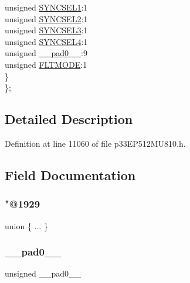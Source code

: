 \begin{DoxyCompactItemize}
\begin{tabbing}
\>\>unsigned \hyperlink{structtag_o_c1_c_o_n2_b_i_t_s_a50e73f95ab1c258ddc64f69c0991deaf}{SYNCSEL1}:1\\
\>\>unsigned \hyperlink{structtag_o_c1_c_o_n2_b_i_t_s_a304907a5d2c4cbf1114a54642a85951e}{SYNCSEL2}:1\\
\>\>unsigned \hyperlink{structtag_o_c1_c_o_n2_b_i_t_s_a6bbd1bd2ead6c9fa713969c6eb0f0c75}{SYNCSEL3}:1\\
\>\>unsigned \hyperlink{structtag_o_c1_c_o_n2_b_i_t_s_a0cd5bbe196c7974953909d27a6307bb7}{SYNCSEL4}:1\\
\>\>unsigned \hyperlink{structtag_o_c1_c_o_n2_b_i_t_s_adf71f3d8410c1f1dbbc96680a92c49af}{\_\_pad0\_\_}:9\\
\>\>unsigned \hyperlink{structtag_o_c1_c_o_n2_b_i_t_s_ad53c2a5303780172219bfd5e0100c782}{FLTMODE}:1\\
\>\} \\
\}; \\

\end{tabbing}\end{DoxyCompactItemize}


\subsection{Detailed Description}


Definition at line 11060 of file p33\+E\+P512\+M\+U810.\+h.



\subsection{Field Documentation}
\mbox{\label{structtag_o_c1_c_o_n2_b_i_t_s_a0b6a4a566f9311ca1959e551afac1bb0}} 
\subsubsection{\texorpdfstring{"@1929}{@1929}}
{\footnotesize\ttfamily union \{ ... \} }

\mbox{\label{structtag_o_c1_c_o_n2_b_i_t_s_adf71f3d8410c1f1dbbc96680a92c49af}} 
\subsubsection{\texorpdfstring{\+\_\+\+\_\+pad0\+\_\+\+\_\+}{\_\_pad0\_\_}}
{\footnotesize\ttfamily unsigned \+\_\+\+\_\+pad0\+\_\+\+\_\+}



